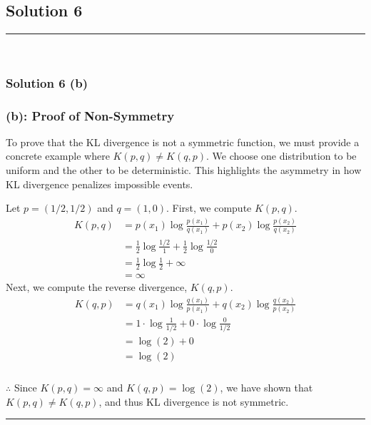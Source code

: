 \documentclass{article}
\begin{document}
\newpage

\subsection*{Solution 6}
\noindent\rule{\textwidth}{0.4pt}\\
\subsubsection*{Solution 6 (b)}


\subsubsection*{(b): Proof of Non-Symmetry}
\parbox{\textwidth}{
To prove that the KL divergence is not a symmetric function, we must provide a concrete example where $K(p, q) \neq K(q, p)$. We choose one distribution to be uniform and the other to be deterministic. This highlights the asymmetry in how KL divergence penalizes impossible events.
}
\parbox{\textwidth}{
Let $p = (1/2, 1/2)$ and $q = (1, 0)$. First, we compute $K(p, q)$.
\begin{align*}
    K(p, q) &= p(x_1) \log\frac{p(x_1)}{q(x_1)} + p(x_2) \log\frac{p(x_2)}{q(x_2)} \\
    &= \frac{1}{2} \log\frac{1/2}{1} + \frac{1}{2} \log\frac{1/2}{0} \\
    &= \frac{1}{2} \log\frac{1}{2} + \infty \\
    &= \infty
\end{align*}
Next, we compute the reverse divergence, $K(q, p)$.
\begin{align*}
    K(q, p) &= q(x_1) \log\frac{q(x_1)}{p(x_1)} + q(x_2) \log\frac{q(x_2)}{p(x_2)} \\
    &= 1 \cdot \log\frac{1}{1/2} + 0 \cdot \log\frac{0}{1/2} \\
    &= \log(2) + 0 \\
    &= \log(2)
\end{align*}
}
\subsubsection*{\normalfont}{$\therefore$ Since $K(p, q) = \infty$ and $K(q, p) = \log(2)$, we have shown that $K(p, q) \neq K(q, p)$, and thus KL divergence is not symmetric.}

\noindent\rule{\textwidth}{0.4pt}\\

\newpage
\end{document}
